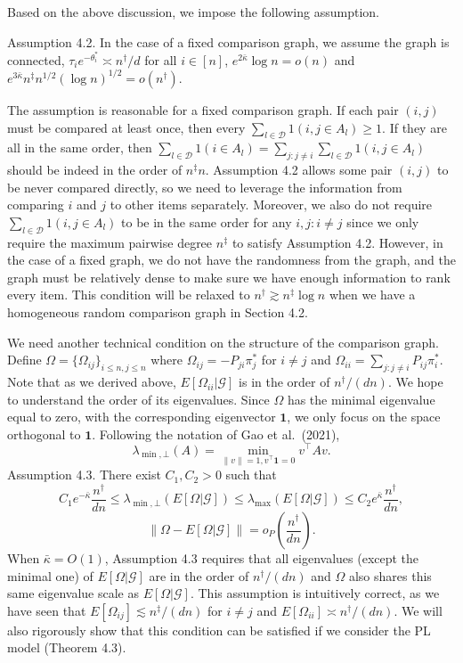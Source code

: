 Based on the above discussion, we impose the following assumption.

Assumption 4.2. In the case of a fixed comparison graph, we assume the graph is connected, \(\tau_{i}e^{- \theta_{i}^{*}}\asymp n^{\dagger} / d\) for all \(i\in [n]\), \(e^{2\bar{\kappa}}\log n = o(n)\) and \(e^{3\bar{\kappa}}n^{\ddagger}n^{1 / 2}(\log n)^{1 / 2} = o(n^{\dagger})\).

The assumption is reasonable for a fixed comparison graph. If each pair \((i,j)\) must be compared at least once, then every \(\sum_{l\in \mathcal{D}}1(i,j\in A_{l})\geq 1\). If they are all in the same order, then \(\sum_{l\in \mathcal{D}}1(i\in A_{l}) = \sum_{j:j\neq i}\sum_{l\in \mathcal{D}}1(i,j\in A_{l})\) should be indeed in the order of \(n^{\ddagger}n\). Assumption 4.2 allows some pair \((i,j)\) to be never compared directly, so we need to leverage the information from comparing \(i\) and \(j\) to other items separately. Moreover, we also do not require \(\sum_{l\in \mathcal{D}}1(i,j\in A_l)\) to be in the same order for any \(i,j:i\neq j\) since we only require the maximum pairwise degree \(n^{\ddagger}\) to satisfy Assumption 4.2. However, in the case of a fixed graph, we do not have the randomness from the graph, and the graph must be relatively dense to make sure we have enough information to rank every item. This condition will be relaxed to \(n^{\dagger}\gtrsim n^{\ddagger}\log n\) when we have a homogeneous random comparison graph in Section 4.2.

We need another technical condition on the structure of the comparison graph. Define \(\Omega = \{\Omega_{ij}\}_{i\leq n,j\leq n}\) where \(\Omega_{ij} = - P_{ji}\pi_j^*\) for \(i\neq j\) and \(\Omega_{ii} = \sum_{j:j\neq i}P_{ij}\pi_i^*\). Note that as we derived above, \(E[\Omega_{ii}|\mathcal{G}]\) is in the order of \(n^{\dagger} / (dn)\). We hope to understand the order of its eigenvalues. Since \(\Omega\) has the minimal eigenvalue equal to zero, with the corresponding eigenvector \(\mathbf{1}\), we only focus on the space orthogonal to \(\mathbf{1}\). Following the notation of Gao et al.~(2021),
\[
\lambda_{\min ,\bot}(A) = \min_{\| v\| = 1,v^{\top}\mathbf{1} = 0}v^{\top}A v.
\]
Assumption 4.3. There exist \(C_1,C_2 > 0\) such that
\[
C_1e^{-\bar{\kappa}}\frac{n^\dagger}{dn}\leq \lambda_{\min ,\bot}(E[\Omega |\mathcal{G}])\leq \lambda_{\max}(E[\Omega |\mathcal{G}])\leq C_2e^{\bar{\kappa}}\frac{n^\dagger}{dn}, \tag{4.1}
\]
\[
\| \Omega -E[\Omega |\mathcal{G}]\| = o_{P}\left(\frac{n^{\dagger}}{dn}\right). \tag{4.2}
\]
When \(\bar{\kappa} = O(1)\), Assumption 4.3 requires that all eigenvalues (except the minimal one) of \(E[\Omega |\mathcal{G}]\) are in the order of \(n^{\dagger} / (dn)\) and \(\Omega\) also shares this same eigenvalue scale as \(E[\Omega |\mathcal{G}]\). This assumption is intuitively correct, as we have seen that \(E[\Omega_{ij}]\lesssim n^{\ddagger} / (dn)\) for \(i\neq j\) and \(E[\Omega_{ii}]\asymp n^{\dagger} / (dn)\). We will also rigorously show that this condition can be satisfied if we consider the PL model (Theorem 4.3).

